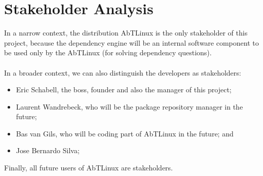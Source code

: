 \section{Stakeholder Analysis}
In a narrow context, the distribution AbTLinux is the only stakeholder of this project, because the dependency engine will be an internal software component to be used only by the AbTLinux (for solving dependency questions).\\
\\
In a broader context, we can also distinguish the developers as stakeholders:
\begin{itemize}
\item Eric Schabell, the boss, founder and also the manager of this project;
\item Laurent Wandrebeck, who will be the package repository manager in the future;
\item Bas van Gils, who will be coding part of AbTLinux in the future; and 
\item Jose Bernardo Silva;
\end{itemize}
Finally, all future users of AbTLinux are stakeholders.
